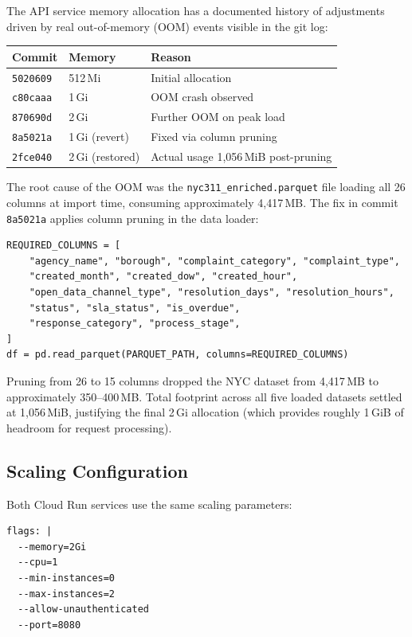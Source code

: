 The API service memory allocation has a documented history of adjustments driven by real out-of-memory (OOM) events visible in the git log:

\begin{center}
\begin{tabular}{lll}
\toprule
\textbf{Commit} & \textbf{Memory} & \textbf{Reason} \\
\midrule
\texttt{5020609} & 512\,Mi & Initial allocation \\
\texttt{c80caaa} & 1\,Gi & OOM crash observed \\
\texttt{870690d} & 2\,Gi & Further OOM on peak load \\
\texttt{8a5021a} & 1\,Gi (revert) & Fixed via column pruning \\
\texttt{2fce040} & 2\,Gi (restored) & Actual usage 1,056\,MiB post-pruning \\
\bottomrule
\end{tabular}
\end{center}

The root cause of the OOM was the \texttt{nyc311\_enriched.parquet} file loading all 26 columns at import time, consuming approximately 4,417\,MB. The fix in commit \texttt{8a5021a} applies column pruning in the data loader:

\begin{lstlisting}[style=python, caption={Column pruning fix in ops\_backend/data\_loader.py}]
REQUIRED_COLUMNS = [
    "agency_name", "borough", "complaint_category", "complaint_type",
    "created_month", "created_dow", "created_hour",
    "open_data_channel_type", "resolution_days", "resolution_hours",
    "status", "sla_status", "is_overdue",
    "response_category", "process_stage",
]
df = pd.read_parquet(PARQUET_PATH, columns=REQUIRED_COLUMNS)
\end{lstlisting}

Pruning from 26 to 15 columns dropped the NYC dataset from 4,417\,MB to approximately 350--400\,MB. Total footprint across all five loaded datasets settled at 1,056\,MiB, justifying the final 2\,Gi allocation (which provides roughly 1\,GiB of headroom for request processing).

\subsection{Scaling Configuration}

Both Cloud Run services use the same scaling parameters:

\begin{lstlisting}[style=yaml, caption={Cloud Run flags in deploy-api.yml}]
flags: |
  --memory=2Gi
  --cpu=1
  --min-instances=0
  --max-instances=2
  --allow-unauthenticated
  --port=8080
\end{lstlisting}

